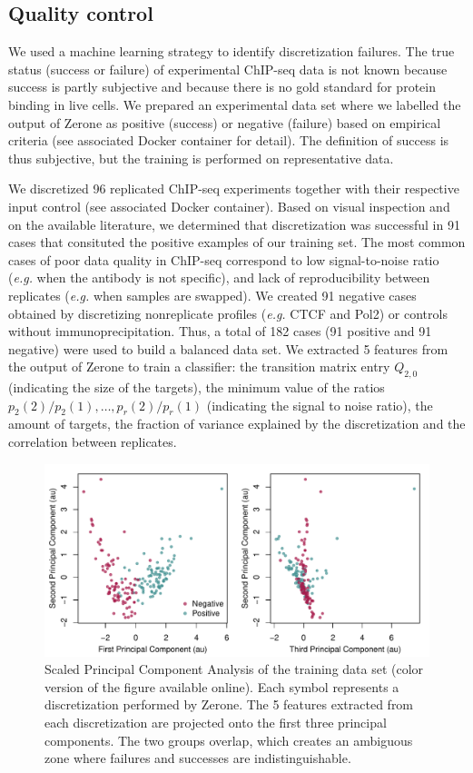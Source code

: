 \documentclass{bioinfo}
\begin{document}
\begin{methods}
\subsection{Quality control}
\label{sub:training}
We used a machine learning strategy to identify discretization
failures. The true status (success or failure) of experimental ChIP-seq
data is not known because success is partly subjective and because
there is no gold standard for protein binding in live cells.
We prepared an experimental data set where we labelled the
output of Zerone as positive (success) or negative (failure) based
on empirical criteria (see associated Docker container for detail).
The definition of success is thus subjective, but the training is
performed on representative data.

We discretized 96 replicated ChIP-seq experiments together with their
respective input control (see associated Docker container). Based on
visual inspection and on the available literature, we determined
that discretization was successful in 91 cases that consituted the
positive examples of our training set. The most common cases of
poor data quality in ChIP-seq correspond to low signal-to-noise ratio
(\textit{e.g.} when the antibody is not specific), and lack of
reproducibility between replicates (\textit{e.g.} when samples are
swapped). We created 91 negative cases obtained by discretizing
nonreplicate profiles (\textit{e.g.} CTCF and Pol2) or controls without
immunoprecipitation. Thus, a total of 182 cases (91 positive and 91
negative) were used to build a balanced data set. We extracted 5
features from the output of Zerone to train a classifier:
the transition matrix entry $Q_{2,0}$ (indicating the size of the
targets), the minimum value of the ratios
$p_2(2)/p_2(1), \ldots, p_r(2)/p_r(1)$ (indicating the
signal to noise ratio), the amount of targets, the fraction of
variance explained by the discretization and the correlation between
replicates.


\begin{figure}[!tpb]
\centerline{\includegraphics[scale=0.45]{PCA.pdf}}
\caption{
  Scaled Principal Component Analysis of the training data set
  (color version of the figure available online).
  Each symbol represents a discretization performed by Zerone. The
  5 features extracted from each discretization are projected onto
  the first three principal components. The two groups overlap,
  which creates an ambiguous zone where failures and successes are
  indistinguishable.
}\label{fig:pca}
\end{figure}



\end{methods}
\end{document}
